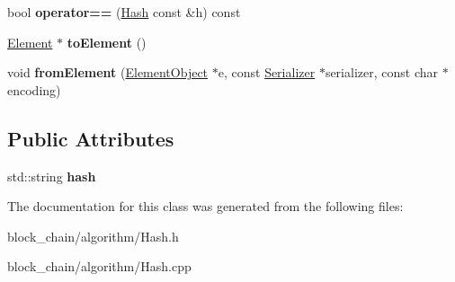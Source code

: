 \begin{DoxyCompactItemize}
\mbox{\label{classHash_a8aafc6563e964ff47dcbba955b0c28f2}} 
bool {\bfseries operator==} (\mbox{\hyperlink{classHash}{Hash}} const \&h) const
\item 
\mbox{\label{classHash_a35e01449aedb17a0172837c87986181e}} 
\mbox{\hyperlink{classElement}{Element}} $\ast$ {\bfseries to\+Element} ()
\item 
\mbox{\label{classHash_a53825b0981f8027244e7bffd84ab2694}} 
void {\bfseries from\+Element} (\mbox{\hyperlink{classElementObject}{Element\+Object}} $\ast$e, const \mbox{\hyperlink{classSerializer}{Serializer}} $\ast$serializer, const char $\ast$encoding)
\end{DoxyCompactItemize}
\subsection*{Public Attributes}
\begin{DoxyCompactItemize}
\item 
\mbox{\label{classHash_a0337821e703a9fc5373635ffcd1a00c9}} 
std\+::string {\bfseries hash}
\end{DoxyCompactItemize}


The documentation for this class was generated from the following files\+:\begin{DoxyCompactItemize}
\item 
block\+\_\+chain/algorithm/Hash.\+h\item 
block\+\_\+chain/algorithm/Hash.\+cpp\end{DoxyCompactItemize}
